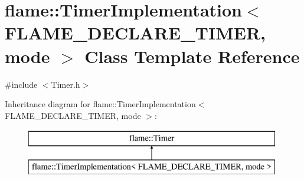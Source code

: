 \hypertarget{classflame_1_1_timer_implementation}{\section{flame\-:\-:Timer\-Implementation$<$ F\-L\-A\-M\-E\-\_\-\-D\-E\-C\-L\-A\-R\-E\-\_\-\-T\-I\-M\-E\-R, mode $>$ Class Template Reference}
\label{classflame_1_1_timer_implementation}
}


{\ttfamily \#include $<$Timer.\-h$>$}

Inheritance diagram for flame\-:\-:Timer\-Implementation$<$ F\-L\-A\-M\-E\-\_\-\-D\-E\-C\-L\-A\-R\-E\-\_\-\-T\-I\-M\-E\-R, mode $>$\-:\begin{figure}[H]
\begin{center}
\leavevmode
\includegraphics[height=2.000000cm]{classflame_1_1_timer_implementation}
\end{center}
\end{figure}
